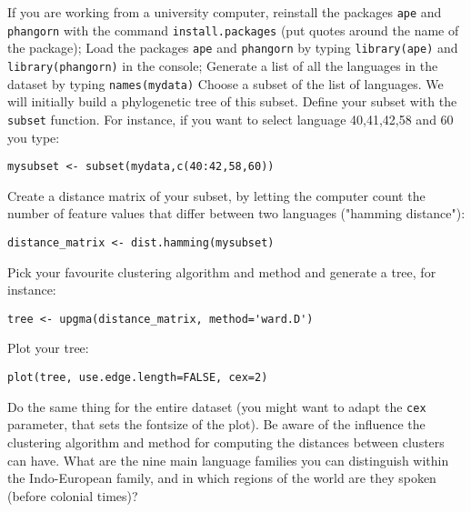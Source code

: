 \documentclass[a4paper, 9pt]{article}
\begin{document}
\begin{exercise}
\action If you are working from a university computer, reinstall the packages \verb|ape| and \verb|phangorn| with the command \verb|install.packages| (put quotes around the name of the package);
\action Load the packages \verb|ape| and \verb|phangorn| by typing \verb|library(ape)| and \verb|library(phangorn)| in the console;
\action Generate a list of all the languages in the dataset by typing \verb|names(mydata)|
\action Choose a subset of the list of languages. We will initially build a phylogenetic tree of this subset.
\action Define your subset with the \verb|subset| function. For instance, if you want to select language 40,41,42,58 and 60 you type:
\begin{lstlisting}
mysubset <- subset(mydata,c(40:42,58,60))
\end{lstlisting}
\action Create a distance matrix of your subset, by letting the computer count the number of feature values that differ between two languages ("hamming distance"):\begin{lstlisting}
distance_matrix <- dist.hamming(mysubset)
\end{lstlisting}
\action Pick your favourite clustering algorithm and method and generate a tree, for instance:\begin{lstlisting}
tree <- upgma(distance_matrix, method='ward.D')
\end{lstlisting}
\action Plot your tree:\begin{lstlisting}
plot(tree, use.edge.length=FALSE, cex=2)
\end{lstlisting}
\action Do the same thing for the entire dataset (you might want to adapt the \verb|cex| parameter, that sets the fontsize of the plot). Be aware of the influence the clustering algorithm and method for computing the distances between clusters can have.
\askstar What are the nine main language families you can distinguish within the Indo-European family, and in which regions of the world are they spoken (before colonial times)?
\end{exercise}

\printbibliography
\end{document}
